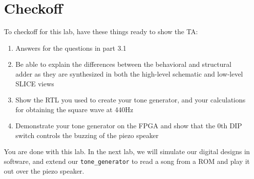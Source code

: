\documentclass[11pt]{article}
\begin{document}
\section{Checkoff}
To checkoff for this lab, have these things ready to show the TA:

\begin{enumerate}
	\item Answers for the questions in part 3.1
	\item Be able to explain the differences between the behavioral and structural adder as they are synthesized in both the high-level schematic and low-level SLICE views
	\item Show the RTL you used to create your tone generator, and your calculations for obtaining the square wave at 440Hz
	\item Demonstrate your tone generator on the FPGA and show that the 0th DIP switch controls the buzzing of the piezo speaker
\end{enumerate}

You are done with this lab. In the next lab, we will simulate our digital designs in software, and extend our \verb|tone_generator| to read a song from a ROM and play it out over the piezo speaker.
\end{document}
